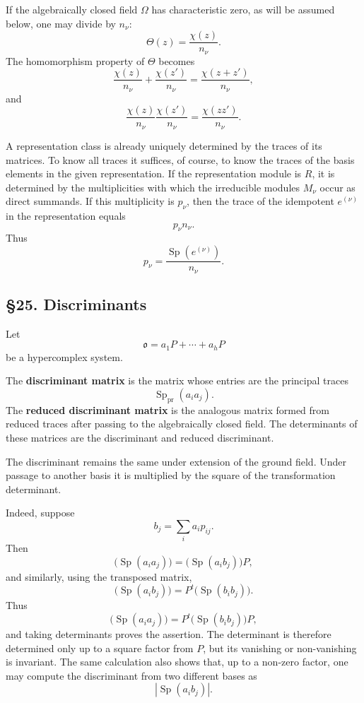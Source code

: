 \documentclass[
  11pt,
]{article}
\begin{document}
If the algebraically closed field \(\Omega\) has characteristic zero, as
will be assumed below, one may divide by \(n_\nu\): \[
  \Theta(z)=\frac{\chi(z)}{n_\nu}.
\] The homomorphism property of \(\Theta\) becomes \[
  \frac{\chi(z)}{n_\nu}+\frac{\chi(z')}{n_\nu}
    =\frac{\chi(z+z')}{n_\nu},
\] and \[
  \frac{\chi(z)}{n_\nu}\frac{\chi(z')}{n_\nu}
    =\frac{\chi(zz')}{n_\nu}.
\]

A representation class is already uniquely determined by the traces of
its matrices. To know all traces it suffices, of course, to know the
traces of the basis elements in the given representation. If the
representation module is \(R\), it is determined by the multiplicities
with which the irreducible modules \(M_\nu\) occur as direct summands.
If this multiplicity is \(p_\nu\), then the trace of the idempotent
\(e^{(\nu)}\) in the representation equals \[
  p_\nu n_\nu.
\] Thus \[
  p_\nu=\frac{\operatorname{Sp}(e^{(\nu)})}{n_\nu}.
\]

\subsection{§25. Discriminants}\label{discriminants}

Let \[
  \mathfrak{o}=a_1P+
\cdots+a_hP
\] be a hypercomplex system.

The \textbf{discriminant matrix} is the matrix whose entries are the
principal traces \[
  \operatorname{Sp}_{\mathrm{pr}}(a_i a_j).
\] The \textbf{reduced discriminant matrix} is the analogous matrix
formed from reduced traces after passing to the algebraically closed
field. The determinants of these matrices are the discriminant and
reduced discriminant.

The discriminant remains the same under extension of the ground field.
Under passage to another basis it is multiplied by the square of the
transformation determinant.

Indeed, suppose \[
  b_j=\sum_i a_i p_{ij}.
\] Then \[
  \bigl(\operatorname{Sp}(a_i a_j)\bigr)
    =\bigl(\operatorname{Sp}(a_i b_j)\bigr)P,
\] and similarly, using the transposed matrix, \[
  \bigl(\operatorname{Sp}(a_i b_j)\bigr)
    =P^t\bigl(\operatorname{Sp}(b_i b_j)\bigr).
\] Thus \[
  \bigl(\operatorname{Sp}(a_i a_j)\bigr)
    =P^t\bigl(\operatorname{Sp}(b_i b_j)\bigr)P,
\] and taking determinants proves the assertion. The determinant is
therefore determined only up to a square factor from \(P\), but its
vanishing or non-vanishing is invariant. The same calculation also shows
that, up to a non-zero factor, one may compute the discriminant from two
different bases as \[
  \left|\operatorname{Sp}(a_i b_j)\right|.
\]
\end{document}
